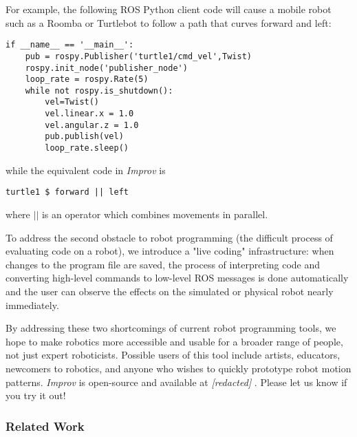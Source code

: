 \documentclass[sigconf]{acmart}
\begin{document}
For example, the following ROS Python client code will cause a
mobile robot such as a Roomba or Turtlebot to follow a path that curves
forward and left:

\begin{verbatim}
if __name__ == '__main__':
    pub = rospy.Publisher('turtle1/cmd_vel',Twist)
    rospy.init_node('publisher_node')
    loop_rate = rospy.Rate(5)
    while not rospy.is_shutdown():
        vel=Twist()
        vel.linear.x = 1.0
        vel.angular.z = 1.0
        pub.publish(vel)
        loop_rate.sleep()
\end{verbatim}

while the equivalent code in \emph{Improv} is

\begin{verbatim}
turtle1 $ forward || left
\end{verbatim}

where $||$ is an operator which combines movements in parallel.

To address the second obstacle to robot programming (the difficult
process of evaluating code on a robot), we introduce a "live coding"
infrastructure: when changes to the program file are saved, the process of
interpreting code and converting high-level commands to low-level ROS messages
is done automatically and the user can observe the effects on the simulated or
physical robot nearly immediately.

By addressing these two shortcomings of current robot programming tools, we hope
to make robotics more accessible and usable for a broader range of people,
not just expert roboticists. Possible users of this tool include
artists, educators, newcomers to robotics, and anyone who wishes to quickly
prototype robot motion patterns. \emph{Improv} is open-source and available at
\emph{[redacted]}
. Please let us know if you try it
out!

\subsubsection*{Related Work}
\end{document}
